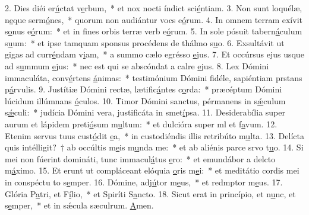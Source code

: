 2. Dies diéi er\uline{ú}ctat v\uline{e}rbum,~* et nox nocti índict sci\uline{é}ntiam.
3. Non sunt loquélæ, n\uline{e}que serm\uline{ó}nes,~* quorum non audiántur vocs e\uline{ó}rum.
4. In omnem terram exívit s\uline{o}nus e\uline{ó}rum:~* et in fines orbis terræ verb e\uline{ó}rum.
5. In sole pósuit tabern\uline{á}culum s\uline{u}um:~* et ipse tamquam sponsus procédens de thálmo s\uline{u}o.
6. Exsultávit ut gigas ad curr\uline{é}ndam v\uline{i}am,~* a summo cælo egrésso \uline{e}jus.
7. Et occúrsus ejus usque ad s\uline{u}mmum \uline{e}jus:~* nec est qui se abscóndat a calre \uline{e}jus.
8. Lex Dómini immaculáta, conv\uline{é}rtens \uline{á}nimas:~* testimónium Dómini fidéle, sapiéntiam prstans p\uline{á}rvulis.
9. Justítiæ Dómini rectæ, lætific\uline{á}ntes c\uline{o}rda:~* præcéptum Dómini lúcidum illúmnans \uline{ó}culos.
10. Timor Dómini sanctus, pérmanens in s\uline{ǽ}culum s\uline{ǽ}culi:~* judícia Dómini vera, justificáta in smet\uline{í}psa.
11. Desiderabília super aurum et lápidem preti\uline{ó}sum m\uline{u}ltum:~* et dulcióra super ml et f\uline{a}vum.
12. Etenim servus tuus cust\uline{ó}dit \uline{e}a,~* in custodiéndis illis retribúto m\uline{u}lta.
13. Delícta quis intélligit?~† ab occúltis m\uline{e}is m\uline{u}nda me:~* et ab aliénis parce srvo t\uline{u}o.
14. Si mei non fúerint domináti, tunc immacul\uline{á}tus \uline{e}ro:~* et emundábor a delcto m\uline{á}ximo.
15. Et erunt ut compláceant elóquia \uline{o}ris m\uline{e}i:~* et meditátio cordis mei in conspéctu to s\uline{e}mper.
16. Dómine, adj\uline{ú}tor m\uline{e}us,~* et redmptor m\uline{e}us.
17. Glória P\uline{a}tri, et F\uline{í}lio,~* et Spiríti S\uline{a}ncto.
18. Sicut erat in princípio, et n\uline{u}nc, et s\uline{e}mper,~* et in sǽcula sæculrum. \uline{A}men.
